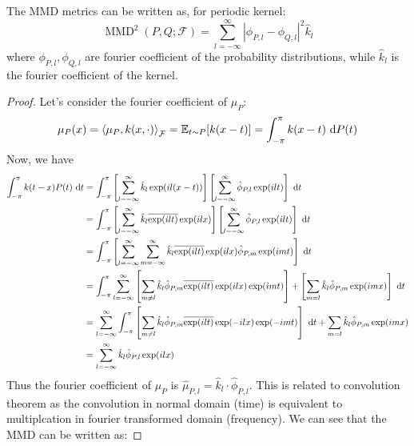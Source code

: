 \begin{theorem}
    The MMD metrics can be written as, for periodic kernel:
    \begin{equation*}
        \operatorname{MMD}^2(P, Q;\mathcal{F}) = \sum^\infty_{l=-\infty} |\phi_{P,l} - \phi_{Q, l}|^2\hat{k}_l
    \end{equation*} 
    where $\phi_{P, l}, \phi_{Q, l}$ are fourier coefficient of the probability distributions, while $\hat{k}_l$ is the fourier coefficient of the kernel.
\end{theorem}
\begin{proof}
    Let's consider the fourier coefficient of $\mu_P$:
    \begin{equation*}
    \begin{aligned}
        \mu_P(x) = \left\langle \mu_P, k(x, \cdot) \right\rangle_\mathcal{F} = \mathbb{E}_{t\sim P}[k(x-t)] = \int^\pi_{-\pi} k(x-t)\ \mathrm{d} P(t)
    \end{aligned}
    \end{equation*}
    Now, we have 
    \begin{equation*}
    \begin{aligned}
        \int^\pi_{-\pi} k(t-x) P(t)\ \mathrm{d} t &=  \int^\pi_{-\pi} \left[ \sum^\infty_{l=-\infty} \hat{k}_l\exp(il(x-t))  \right]\left[ \sum^\infty_{l=-\infty}\hat{\phi}_{P, l}\exp(ilt) \right] \ \mathrm{d} t \\
        &= \int^\pi_{-\pi}\left[ \sum^\infty_{l=-\infty} \hat{k}_l\overline{\exp(ilt)}\exp(ilx)  \right]\left[ \sum^\infty_{l=-\infty} \hat{\phi}_{P, l} \exp(ilt)  \right]\ \mathrm{d} t \\
        &= \int^\pi_{-\pi} \left[ \sum^\infty_{l=-\infty}\sum^\infty_{m=-\infty} \hat{k}_l\overline{\exp(ilt)}\exp(ilx) \hat{\phi}_{P, m} \exp(imt)  \right] \ \mathrm{d} t \\
        &= \int^\pi_{-\pi} \sum^\infty_{l=-\infty}\left[ \sum_{m\ne l} \hat{k}_l\hat{\phi}_{P, m}\overline{\exp(ilt)}\exp(ilx) \exp(imt) \right] + \left[ \sum_{m=l} \hat{k}_l\hat{\phi}_{P, m}\exp(imx)  \right]\ \mathrm{d} t \\
        &= \sum^{\infty}_{l=-\infty} \int^{\pi}_{-\pi}\left[ \sum_{m\ne l} \hat{k}_l\hat{\phi}_{P, m}\overline{\exp(ilt)}\exp(-ilx) \exp(-imt) \right]\ \mathrm{d} t + \sum_{m=l} \hat{k}_l\hat{\phi}_{P, m}\exp(imx) \\
        &= \sum^\infty_{l=-\infty} \hat{k}_l\hat{\phi}_{P, l}\exp(ilx) \\
    \end{aligned}
    \end{equation*}
    Thus the fourier coefficient of $\mu_P$ is $\hat{\mu}_{P, l} = \hat{k}_l\cdot\hat{\phi}_{P, l}$. This is related to convolution theorem as the convolution in normal domain (time) is equivalent to multiplcation in fourier transformed domain (frequency). We can see that the MMD can be written as:

\end{proof}
